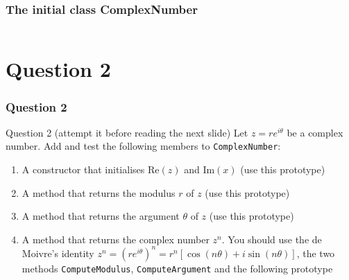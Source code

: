 \documentclass[8pt, compress]{beamer}
\def\inline{\lstinline[basicstyle=\ttfamily,keywordstyle={},directivestyle={}]}
\begin{document}
\begin{frame}[fragile]
  \frametitle{The initial class ComplexNumber}
  \begin{columns}[t]
     

     

  \end{columns}
\end{frame}

\section{Question 2}
\begin{frame}[fragile]
  \frametitle{Question 2}
  \begin{alertblock}{Question 2 (attempt it before reading the next slide)}
  Let $z= r e^{i \theta}$ be a complex number. Add and test the following members to
  \inline|ComplexNumber|:
  \begin{enumerate}
    \item A constructor that initialises $\text{Re}(z)$ and $\text{Im}(x)$ (use
      this prototype)
       

    \item A method that returns the modulus $r$ of $z$ (use this prototype)
       

    \item A method that returns the argument $\theta$ of $z$ (use this prototype)
       

    \item A method that returns the complex number $z^n$. You should use the de
      Moivre's identity $z^n = (r e^{i\theta})^n 
                             = r^n [ \cos(n\theta) + i \sin(n \theta) ]$, the
      two methods \inline|ComputeModulus|, \inline|ComputeArgument| and the
      following prototype
       
  \end{enumerate}

  \end{alertblock}
\end{frame}
\end{document}
